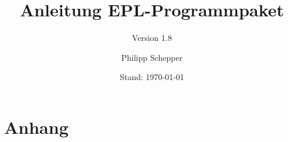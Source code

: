 \documentclass[a4paper,ngerman,oneside]{scrbook}
\title{Anleitung EPL-Programmpaket}
\subtitle{Version 1.8}
\author{Philipp Schepper}
\date{Stand: \today}
\begin{document}
\maketitle

\frontmatter
\tableofcontents


\mainmatter






\appendix
\part{Anhang}



\end{document}
